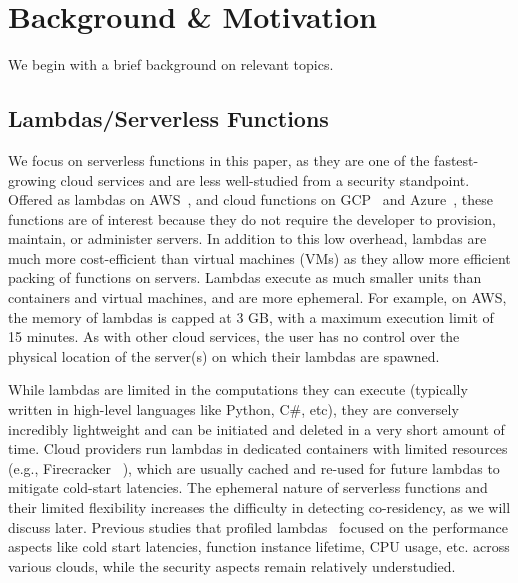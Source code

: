 \section{Background \& Motivation}
\label{sec:background}

We begin with a brief background on relevant topics.


\subsection{Lambdas/Serverless Functions} 
\label{sec:background:lambdas}

We focus on serverless functions in this paper, as they are one of the
fastest-growing cloud services and are less well-studied from a security 
standpoint. Offered as lambdas on
AWS~\cite{awslambda}, and cloud functions on GCP~\cite{gcpfunctions} and 
Azure~\cite{azurefunctions}, these functions are of interest because they do 
not require the developer
to provision, maintain, or administer servers. In addition to this low overhead,
lambdas are much more cost-efficient than virtual machines (VMs) as they allow
more efficient packing of functions on servers. Lambdas execute as much smaller
units than containers and virtual machines, and are more ephemeral. 
For example, on AWS, the memory 
of lambdas is capped at 3 GB, with a maximum execution limit of 15 minutes. 
As with other cloud services, the user has no control over the physical location
of the server(s) on which their lambdas are spawned.

While lambdas are limited in the computations they can execute (typically 
written in high-level languages like Python, C\#, etc), 
they are conversely incredibly lightweight and
can be initiated and deleted in a very short amount of time. Cloud providers 
run lambdas in dedicated containers with limited resources (e.g., Firecracker
~\cite{firecracker}), which are usually cached and re-used for future lambdas 
to mitigate cold-start latencies\cite{awscontainerreuse}. The ephemeral nature of serverless
functions and their limited flexibility increases the difficulty in detecting 
co-residency, as we will discuss later. Previous studies that profiled 
lambdas~\cite{wangusenix2018} focused on the performance aspects like 
cold start latencies, function instance lifetime, CPU usage, etc. 
across various clouds, while the security aspects remain relatively understudied.


